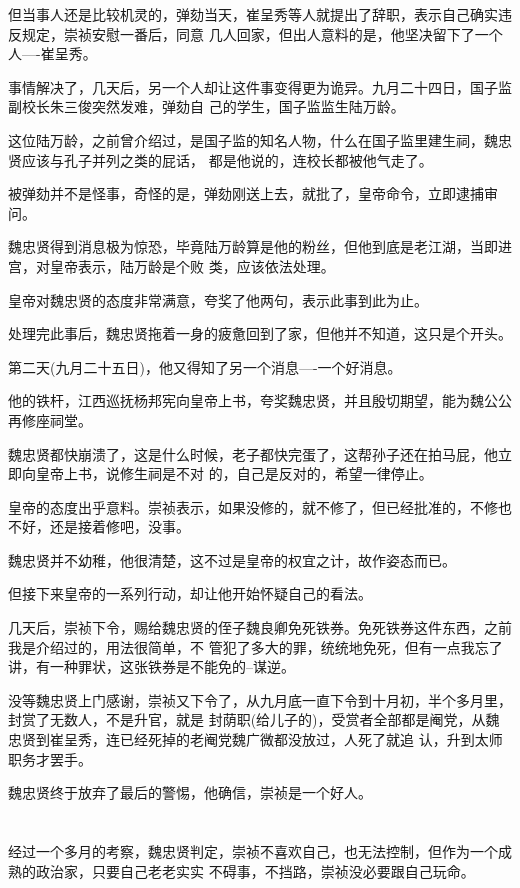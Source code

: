 \documentclass[11pt,a4paper,onecolumn]{article}
\begin{document}
但当事人还是比较机灵的，弹劾当天，崔呈秀等人就提出了辞职，表示自己确实违反规定，崇祯安慰一番后，同意
几人回家，但出人意料的是，他坚决留下了一个人----崔呈秀。

事情解决了，几天后，另一个人却让这件事变得更为诡异。九月二十四日，国子监副校长朱三俊突然发难，弹劾自
己的学生，国子监监生陆万龄。

这位陆万龄，之前曾介绍过，是国子监的知名人物，什么在国子监里建生祠，魏忠贤应该与孔子并列之类的屁话，
都是他说的，连校长都被他气走了。

被弹劾并不是怪事，奇怪的是，弹劾刚送上去，就批了，皇帝命令，立即逮捕审问。

魏忠贤得到消息极为惊恐，毕竟陆万龄算是他的粉丝，但他到底是老江湖，当即进宫，对皇帝表示，陆万龄是个败
类，应该依法处理。

皇帝对魏忠贤的态度非常满意，夸奖了他两句，表示此事到此为止。

处理完此事后，魏忠贤拖着一身的疲惫回到了家，但他并不知道，这只是个开头。

第二天(九月二十五日)，他又得知了另一个消息----一个好消息。

他的铁杆，江西巡抚杨邦宪向皇帝上书，夸奖魏忠贤，并且殷切期望，能为魏公公再修座祠堂。

魏忠贤都快崩溃了，这是什么时候，老子都快完蛋了，这帮孙子还在拍马屁，他立即向皇帝上书，说修生祠是不对
的，自己是反对的，希望一律停止。

皇帝的态度出乎意料。崇祯表示，如果没修的，就不修了，但已经批准的，不修也不好，还是接着修吧，没事。

魏忠贤并不幼稚，他很清楚，这不过是皇帝的权宜之计，故作姿态而已。

但接下来皇帝的一系列行动，却让他开始怀疑自己的看法。

几天后，崇祯下令，赐给魏忠贤的侄子魏良卿免死铁券。免死铁券这件东西，之前我是介绍过的，用法很简单，不
管犯了多大的罪，统统地免死，但有一点我忘了讲，有一种罪状，这张铁券是不能免的--谋逆。

没等魏忠贤上门感谢，崇祯又下令了，从九月底一直下令到十月初，半个多月里，封赏了无数人，不是升官，就是
封荫职(给儿子的)，受赏者全部都是阉党，从魏忠贤到崔呈秀，连已经死掉的老阉党魏广微都没放过，人死了就追
认，升到太师职务才罢手。

魏忠贤终于放弃了最后的警惕，他确信，崇祯是一个好人。

\section[\thesection]{}

经过一个多月的考察，魏忠贤判定，崇祯不喜欢自己，也无法控制，但作为一个成熟的政治家，只要自己老老实实
不碍事，不挡路，崇祯没必要跟自己玩命。
\end{document}
